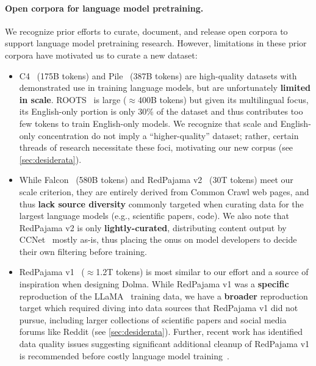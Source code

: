 \documentclass{article}
\newcommand{\dolma}{Dolma\xspace}
\begin{document}
\paragraph{Open corpora for language model pretraining.} 
We recognize prior efforts to curate, document, and release open corpora to support language model pretraining research.
However, limitations in these prior corpora have motivated us to curate a new dataset:
\begin{itemize}[leftmargin=1em,topsep=1mm,itemsep=1mm]
    \item C4~\citep{raffel2020exploring} (175B tokens) and Pile~\citep{Gao2020ThePA} (387B tokens) are high-quality datasets with demonstrated use in training language models, but are unfortunately \textbf{limited in scale}. 
    ROOTS~\citep{piktus-etal-2023-roots} is large ($\approx$400B tokens) but given its multilingual focus, its English-only portion is only 30\% of the dataset and thus contributes too few tokens to train English-only models. We recognize that scale and English-only concentration do not imply a ``higher-quality'' dataset; rather, certain threads of research necessitate these foci, motivating our new corpus (see \autoref{sec:desiderata}).
    \item While Falcon~\citep{falcon40b} (580B tokens) and RedPajama v2~\citep{redpajama2} (30T tokens) meet our scale criterion, they are entirely derived from Common Crawl web pages, and thus \textbf{lack source diversity} commonly targeted when curating data for the largest language models (e.g., scientific papers, code). We also note that RedPajama v2 is only \textbf{lightly-curated}, distributing content output by CCNet~\citep{wenzek-etal-2020-ccnet} mostly as-is,
    thus placing the onus on model developers to decide their own filtering before training.
    \item RedPajama v1~\citep{together2023redpajama} ($\approx$1.2T tokens) is most similar to our effort and a source of inspiration when designing \dolma. While RedPajama v1 was a \textbf{specific} reproduction of the LLaMA~\citep{Touvron2023LLaMAOA} training data, we have a \textbf{broader} reproduction target which required diving into data sources that RedPajama v1 did not pursue, including larger collections of scientific papers and social media forums like Reddit (see \autoref{sec:desiderata}).
    Further, recent work has identified data quality issues suggesting significant additional cleanup of RedPajama v1 is recommended before costly language model training~\citep{cerebras2023slimpajama,wimbd}.
\end{itemize}
\end{document}
